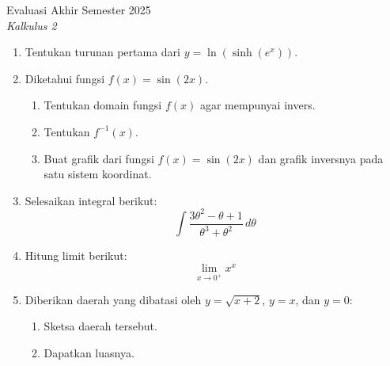 \documentclass[12pt]{article}
\begin{document}
\begin{center}
    {Evaluasi Akhir Semester 2025} \\
    \textit{Kalkulus 2} \\
\end{center}

\vspace{0.5cm}

\begin{enumerate}
    \item Tentukan turunan pertama dari $y = \ln(\sinh(e^x))$.

    \item Diketahui fungsi $f(x) = \sin(2x)$.
    \begin{enumerate}
        \item Tentukan domain fungsi $f(x)$ agar mempunyai invers.
        \item Tentukan $f^{-1}(x)$.
        \item Buat grafik dari fungsi $f(x) = \sin(2x)$ dan grafik inversnya pada satu sistem koordinat.
    \end{enumerate}

    \item Selesaikan integral berikut:
    \[
        \int \frac{3\theta^2 - \theta + 1}{\theta^3 + \theta^2} \, d\theta 
    \]

    \item Hitung limit berikut:
    \[
        \lim_{x \to 0^+} x^{x}
    \]

    \item Diberikan daerah yang dibatasi oleh $y = \sqrt{x+2}$, $y = x$, dan $y = 0$:
    \begin{enumerate}
        \item Sketsa daerah tersebut.
        \item Dapatkan luasnya.
    \end{enumerate}
\end{enumerate}
\end{document}
